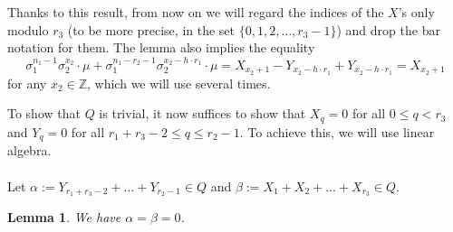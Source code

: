 \documentclass[12pt,a4paper]{article}
\newtheorem{lemma}[theorem]{Lemma}
\theoremstyle{definition}
\newcommand{\Z}{\mathbb{Z}}
\begin{document}
Thanks to this result, from now on we will regard the indices of the $X$'s only modulo $r_3$ (to be more precise, in the set $\{0,1,2,\dots,r_3-1\}$) and drop the bar notation for them. The lemma also implies the equality $$\sigma_1^{n_1-1}\sigma_2^{x_2}\cdot \mu+\sigma_1^{n_1-r_2-1}\sigma_2^{x_2-h\cdot r_1}\cdot \mu=X_{x_2+1}-Y_{x_2-h\cdot r_1}+Y_{x_2-h\cdot r_1}= X_{x_2+1}$$ for any $x_2\in\Z$, which we will use several times. 

To show that $Q$ is trivial, it now suffices to show that $X_q=0$ for all $0\leq q< r_3$ and $Y_q=0$ for all $r_1+r_3-2\leq q\leq r_2-1$. To achieve this, we will use linear algebra.

%
\paragraph*{}
Let $\alpha:= Y_{r_1+r_3-2}+\dots+Y_{r_2-1}\in Q$ and $\beta:=X_1+X_2+\dots+X_{r_3}\in Q$.
\begin{lemma}
We have $\alpha=\beta=0$.
\end{lemma}
\end{document}
